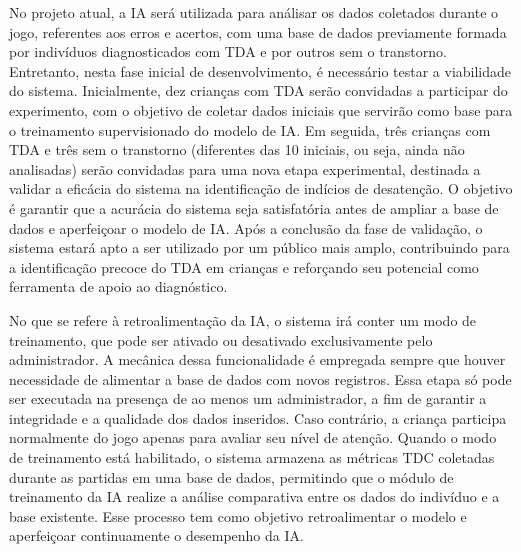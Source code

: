 No projeto atual, a IA será utilizada para análisar os dados coletados durante o jogo, referentes aos erros e acertos, com uma base de dados previamente formada por indivíduos diagnosticados com TDA e por outros sem o transtorno. Entretanto, nesta fase inicial de desenvolvimento, é necessário testar a viabilidade do sistema. Inicialmente, dez crianças com TDA serão convidadas a participar do experimento, com o objetivo de coletar dados iniciais que servirão como base para o treinamento supervisionado do modelo de IA. Em seguida, três crianças com TDA e três sem o transtorno (diferentes das 10 iniciais, ou seja, ainda não analisadas) 
serão convidadas para uma nova etapa experimental, destinada a validar a eficácia do sistema na identificação de indícios de desatenção. O objetivo é garantir que a acurácia do sistema seja satisfatória antes de ampliar a base de dados e aperfeiçoar o modelo de IA. Após a conclusão da fase de validação, o sistema estará apto a ser utilizado por um público mais amplo, contribuindo para a identificação precoce do TDA em crianças e reforçando seu potencial como ferramenta de apoio ao diagnóstico. 

No que se refere à retroalimentação da IA, o sistema irá conter um modo de treinamento, que pode ser ativado ou desativado exclusivamente pelo administrador. A mecânica dessa funcionalidade é empregada sempre que houver necessidade de alimentar a base de dados com novos registros. Essa etapa só pode ser executada na presença de ao menos um administrador, a fim de garantir a integridade e a qualidade dos dados inseridos. Caso contrário, a criança participa normalmente do jogo apenas para avaliar seu nível de atenção. Quando o modo de treinamento está habilitado, o sistema armazena as métricas TDC coletadas durante as partidas em uma base de dados, permitindo que o módulo de treinamento da IA realize a análise comparativa entre os dados do indivíduo e a base existente. Esse processo tem como objetivo retroalimentar o modelo e aperfeiçoar continuamente o desempenho da IA. 

